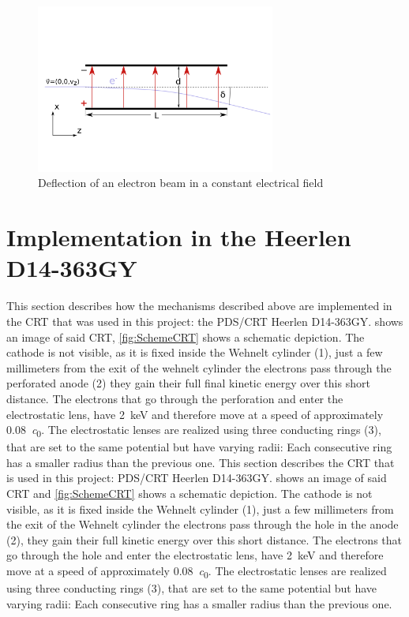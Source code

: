 \begin{figure}
	\centering
	\includegraphics[width=0.7\textwidth]{Chapters/CRT-Basics/DeflectionPlate2}
	\caption{Deflection of an electron beam in a constant electrical field}
	\label{fig:deflectionplate2}
\end{figure}

\section{Implementation in the Heerlen D14-363GY }

This section describes how the mechanisms described above are implemented in the CRT that was used in this project: the PDS/CRT Heerlen D14-363GY.  shows an image of said CRT, \cref{fig:SchemeCRT} shows a schematic depiction. The cathode is not visible, as it is fixed inside the Wehnelt cylinder (1), just a few millimeters from the exit of the wehnelt cylinder the electrons pass through the perforated anode (2) they gain their full final kinetic energy over this short distance. The electrons that go through the perforation and enter the electrostatic lens, have \SI{2}{\kilo\electronvolt} and therefore move at a speed of approximately \SI{0.08}{\clight}. 
The electrostatic lenses are realized using three conducting rings (3), that are set to the same potential but have varying radii: Each consecutive ring has a smaller radius than the previous one. 
This section describes the CRT that is used in this project: PDS/CRT Heerlen D14-363GY.  shows an image of said CRT and \cref{fig:SchemeCRT} shows a schematic depiction. The cathode is not visible, as it is fixed inside the Wehnelt cylinder (1), just a few millimeters from the exit of the Wehnelt cylinder the electrons pass through the hole in the anode (2), they gain their full kinetic energy over this short distance. The electrons that go through the hole and enter the electrostatic lens, have \SI{2}{\kilo\electronvolt} and therefore move at a speed of approximately \SI{0.08}{\clight}. 
The electrostatic lenses are realized using three conducting rings (3), that are set to the same potential but have varying radii: Each consecutive ring has a smaller radius than the previous one.

